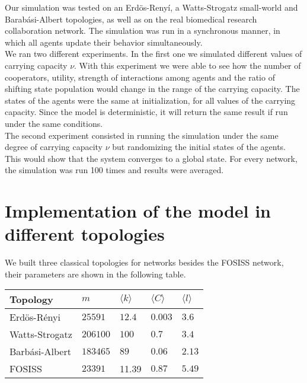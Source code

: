 \documentclass{bmcart}
\begin{document}
Our simulation was tested on an Erd\"{o}s-Reny\'i, a
Watts-Strogatz small-world and Barab\'asi-Albert topologies, as well
as on the real biomedical research collaboration network. The
simulation was run in a synchronous manner, in which all agents update their
behavior simultaneously. \\   

We ran two different experiments. In the first one we simulated different
values of carrying capacity $\nu$. With this experiment we were able
to see how the number of cooperators, utility, strength of interactions
among agents and the ratio of shifting state population would change
in the range of the carrying capacity. The states of the agents were
the same at initialization, for all values of the carrying
capacity. Since the model is deterministic, it will return the same
result if run under the same conditions.\\

The second experiment consisted in running the simulation under the
same degree of carrying capacity $\nu$ but randomizing the initial
states of the agents. This would show that the system converges to a
global state. For every network, the simulation was run 100 times and
results were averaged.

\section*{Implementation of the model in different topologies}

We built three classical topologies for networks besides the FOSISS network, their parameters are shown in the following table.\\


\begin{tabular}{| l |  l | l |l|l|}
\hline
\bf{Topology}       & $m$              & $\langle k \rangle$          & $\langle C \rangle$      & $\langle l \rangle$ \\ \hline
Erd\"{o}s-R\'enyi  &  $25591$      &  $12.4$        &  $0.003$ & $3.6$  \\ \hline
Watts-Strogatz    &  $206100$   &  $100$         &  $0.7$      & $3.4$  \\ \hline
Barb\'asi-Albert    &  $183465$   &  $89$           &  $0.06$    & $2.13$ \\ \hline
FOSISS                    &  $23391$     &   11.39     &  $0.87$    &  $5.49$ \\ \hline
\end{tabular}\\ 
\end{document}
